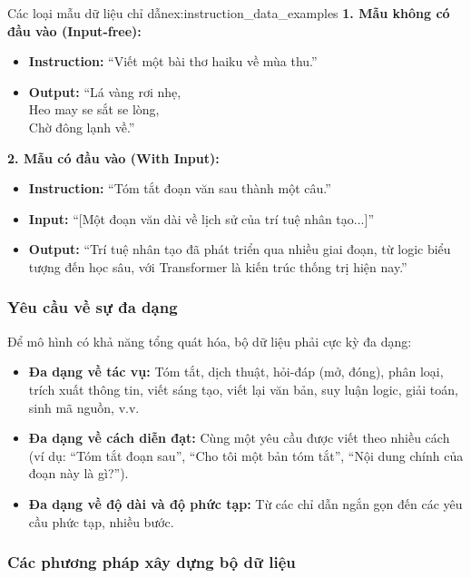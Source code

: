 \begin{example}{Các loại mẫu dữ liệu chỉ dẫn}{ex:instruction_data_examples}
    \textbf{1. Mẫu không có đầu vào (Input-free):}
    \begin{itemize}
        \item \textbf{Instruction:} “Viết một bài thơ haiku về mùa thu.”
        \item \textbf{Output:} “Lá vàng rơi nhẹ, \\ Heo may se sắt se lòng, \\ Chờ đông lạnh về.”
    \end{itemize}

    \textbf{2. Mẫu có đầu vào (With Input):}
    \begin{itemize}
        \item \textbf{Instruction:} “Tóm tắt đoạn văn sau thành một câu.”
        \item \textbf{Input:} “[Một đoạn văn dài về lịch sử của trí tuệ nhân tạo...]”
        \item \textbf{Output:} “Trí tuệ nhân tạo đã phát triển qua nhiều giai đoạn, từ logic biểu tượng đến học sâu, với Transformer là kiến trúc thống trị hiện nay.”
    \end{itemize}
\end{example}

\subsubsection{Yêu cầu về sự đa dạng}
Để mô hình có khả năng tổng quát hóa, bộ dữ liệu phải cực kỳ đa dạng:
\begin{itemize}
    \item \textbf{Đa dạng về tác vụ:} Tóm tắt, dịch thuật, hỏi-đáp (mở, đóng), phân loại, trích xuất thông tin, viết sáng tạo, viết lại văn bản, suy luận logic, giải toán, sinh mã nguồn, v.v.
    \item \textbf{Đa dạng về cách diễn đạt:} Cùng một yêu cầu được viết theo nhiều cách (ví dụ: “Tóm tắt đoạn sau”, “Cho tôi một bản tóm tắt”, “Nội dung chính của đoạn này là gì?”).
    \item \textbf{Đa dạng về độ dài và độ phức tạp:} Từ các chỉ dẫn ngắn gọn đến các yêu cầu phức tạp, nhiều bước.
\end{itemize}

\subsubsection{Các phương pháp xây dựng bộ dữ liệu}
